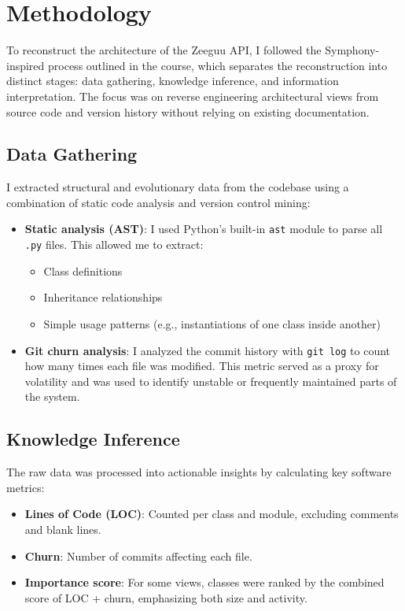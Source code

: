 \section{Methodology}

To reconstruct the architecture of the Zeeguu API, I followed the Symphony-inspired process outlined in the course, which separates the reconstruction into distinct stages: data gathering, knowledge inference, and information interpretation. The focus was on reverse engineering architectural views from source code and version history without relying on existing documentation.

\subsection{Data Gathering}

I extracted structural and evolutionary data from the codebase using a combination of static code analysis and version control mining:

\begin{itemize}
  \item \textbf{Static analysis (AST)}: I used Python’s built-in \texttt{ast} module to parse all \texttt{.py} files. This allowed me to extract:
  \begin{itemize}
    \item Class definitions
    \item Inheritance relationships
    \item Simple usage patterns (e.g., instantiations of one class inside another)
  \end{itemize}
  
  \item \textbf{Git churn analysis}: I analyzed the commit history with \texttt{git log} to count how many times each file was modified. This metric served as a proxy for volatility and was used to identify unstable or frequently maintained parts of the system.
\end{itemize}

\subsection{Knowledge Inference}

The raw data was processed into actionable insights by calculating key software metrics:

\begin{itemize}
  \item \textbf{Lines of Code (LOC)}: Counted per class and module, excluding comments and blank lines.
  \item \textbf{Churn}: Number of commits affecting each file.
  \item \textbf{Importance score}: For some views, classes were ranked by the combined score of LOC + churn, emphasizing both size and activity.
\end{itemize}

